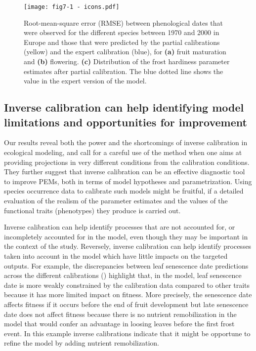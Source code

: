 \documentclass[preprint,12pt,authoryear]{elsarticle}
\begin{document}
\begin{figure}
\centering
\begin{subcaptiongroup}
\label{fig:5A} 
\label{fig:5B}
\label{fig:5C}
\end{subcaptiongroup}
\vspace*{-1cm}
\centerline{\texttt{[image: fig7-1 - icons.pdf]}}
\caption{Root-mean-square error (RMSE) between phenological dates that were observed for the different species between 1970 and 2000 in Europe and those that were predicted by the partial calibrations (yellow) and the expert calibration (blue), for \textbf{(a)} fruit maturation and \textbf{(b)} flowering. \textbf{(c)} Distribution of the frost hardiness parameter estimates after partial calibration. The blue dotted line shows the value in the expert version of the model.}
\label{fig:5}
\end{figure}


\subsection{Inverse calibration can help identifying model limitations and opportunities for improvement}

Our results reveal both the power and the shortcomings of inverse calibration in ecological modeling, and call for a careful use of the method when one aims at providing projections in very different conditions from the calibration conditions. They further suggest that inverse calibration can be an effective diagnostic tool to improve PEMs, both in terms of model hypotheses and parametrization. Using species occurrence data to calibrate such models might be fruitful, if a detailed evaluation of the realism of the parameter estimates and the values of the functional traits (phenotypes) they produce is carried out.

Inverse calibration can help identify processes that are not accounted for, or incompletely accounted for in the model, even though they may be important in the context of the study.  Reversely, inverse calibration can help identify processes taken into account in the model which have little impacts on the targeted outputs. For example, the discrepancies between leaf senescence date predictions across the different calibrations () highlight that, in the model, leaf senescence date is more weakly constrained by the calibration data compared to other traits because it has more limited impact on fitness. More precisely, the senescence date affects fitness if it occurs before the end of fruit development but late senescence date does not affect fitness because there is no nutrient remobilization in the model that would confer an advantage in loosing leaves before the first frost event. In this example inverse calibrations indicate that it might be opportune to refine the model by adding nutrient remobilization.
\end{document}

